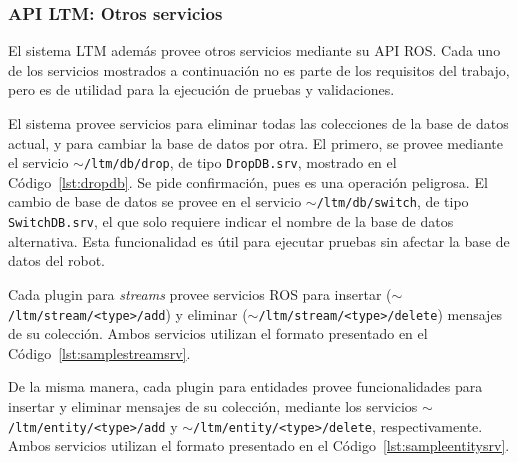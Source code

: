 \subsubsection{API LTM: Otros servicios}

El sistema LTM además provee otros servicios mediante su API ROS. Cada uno de los servicios mostrados a continuación no es parte de los requisitos del trabajo, pero es de utilidad para la ejecución de pruebas y validaciones.

El sistema provee servicios para eliminar todas las colecciones de la base de datos actual, y para cambiar la base de datos por otra. El primero, se provee mediante el servicio \texttt{$\sim$/ltm/db/drop}, de tipo \texttt{DropDB.srv}, mostrado en el Código~\ref{lst:dropdb}. Se pide confirmación, pues es una operación peligrosa. El cambio de base de datos se provee en el servicio  \texttt{$\sim$/ltm/db/switch}, de tipo \texttt{SwitchDB.srv}, el que solo requiere indicar el nombre de la base de datos alternativa. Esta funcionalidad es útil para ejecutar pruebas sin afectar la base de datos del robot.
\lstset{style=/Style/ROS/MSG}


Cada plugin para \textit{streams} provee servicios ROS para insertar (\texttt{$\sim$/ltm/stream/\textless type\textgreater/add}) y eliminar (\texttt{$\sim$/ltm/stream/\textless type\textgreater/delete}) mensajes de su colección. Ambos servicios utilizan el formato presentado en el Código~\ref{lst:samplestreamsrv}.

De la misma manera, cada plugin para entidades provee funcionalidades para insertar y eliminar mensajes de su colección, mediante los servicios \texttt{$\sim$/ltm/entity/\textless type\textgreater/add} y \texttt{$\sim$/ltm/entity/\textless type\textgreater/delete}, respectivamente. Ambos servicios utilizan el formato presentado en el Código~\ref{lst:sampleentitysrv}.




